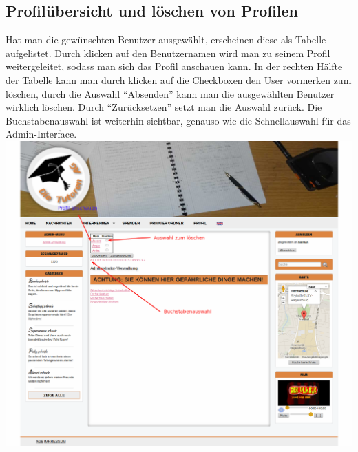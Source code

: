 \subsection{Profilübersicht und löschen von Profilen}
Hat man die gewünschten Benutzer ausgewählt, erscheinen diese als Tabelle aufgelistet.
Durch klicken auf den Benutzernamen wird man zu seinem Profil weitergeleitet, sodass man sich das Profil anschauen kann. In der rechten Hälfte der Tabelle kann man durch klicken auf die Checkboxen den User vormerken
zum löschen, durch die Auswahl ``Absenden'' kann man die ausgewählten Benutzer wirklich löschen. Durch ``Zurücksetzen'' setzt man die Auswahl zurück. Die Buchstabenauswahl ist weiterhin sichtbar, genauso wie die 
Schnellauswahl für das Admin-Interface.\\
\includegraphics[width=1\textwidth]{../Screenshots/de/admin/admin_delprofile_del}